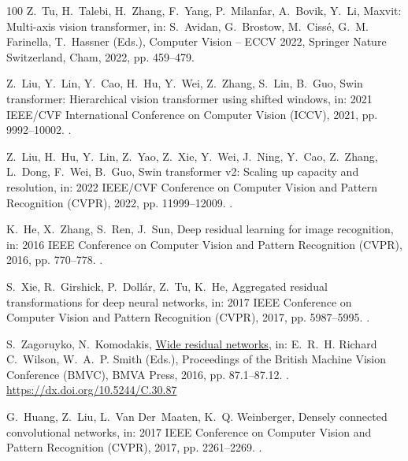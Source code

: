 \documentclass[final,3p,times,twocolumn]{elsarticle}
\begin{document}
\begin{thebibliography}{100}
Z.~Tu, H.~Talebi, H.~Zhang, F.~Yang, P.~Milanfar, A.~Bovik, Y.~Li, Maxvit:
  Multi-axis vision transformer, in: S.~Avidan, G.~Brostow, M.~Ciss{\'e}, G.~M.
  Farinella, T.~Hassner (Eds.), Computer Vision -- ECCV 2022, Springer Nature
  Switzerland, Cham, 2022, pp. 459--479.

Z.~Liu, Y.~Lin, Y.~Cao, H.~Hu, Y.~Wei, Z.~Zhang, S.~Lin, B.~Guo, Swin
  transformer: Hierarchical vision transformer using shifted windows, in: 2021
  IEEE/CVF International Conference on Computer Vision (ICCV), 2021, pp.
  9992--10002.
\newblock \href {https://doi.org/10.1109/ICCV48922.2021.00986}
  {}.

Z.~Liu, H.~Hu, Y.~Lin, Z.~Yao, Z.~Xie, Y.~Wei, J.~Ning, Y.~Cao, Z.~Zhang,
  L.~Dong, F.~Wei, B.~Guo, Swin transformer v2: Scaling up capacity and
  resolution, in: 2022 IEEE/CVF Conference on Computer Vision and Pattern
  Recognition (CVPR), 2022, pp. 11999--12009.
\newblock \href {https://doi.org/10.1109/CVPR52688.2022.01170}
  {}.

K.~He, X.~Zhang, S.~Ren, J.~Sun, Deep residual learning for image recognition,
  in: 2016 IEEE Conference on Computer Vision and Pattern Recognition (CVPR),
  2016, pp. 770--778.
\newblock \href {https://doi.org/10.1109/CVPR.2016.90}
  {}.

S.~Xie, R.~Girshick, P.~Dollár, Z.~Tu, K.~He, Aggregated residual
  transformations for deep neural networks, in: 2017 IEEE Conference on
  Computer Vision and Pattern Recognition (CVPR), 2017, pp. 5987--5995.
\newblock \href {https://doi.org/10.1109/CVPR.2017.634}
  {}.

S.~Zagoruyko, N.~Komodakis, \href{https://dx.doi.org/10.5244/C.30.87}{Wide
  residual networks}, in: E.~R.~H. Richard C.~Wilson, W.~A.~P. Smith (Eds.),
  Proceedings of the British Machine Vision Conference (BMVC), BMVA Press,
  2016, pp. 87.1--87.12.
\newblock \href {https://doi.org/10.5244/C.30.87} {}.
\newline\urlprefix\url{https://dx.doi.org/10.5244/C.30.87}

G.~Huang, Z.~Liu, L.~Van Der~Maaten, K.~Q. Weinberger, Densely connected
  convolutional networks, in: 2017 IEEE Conference on Computer Vision and
  Pattern Recognition (CVPR), 2017, pp. 2261--2269.
\newblock \href {https://doi.org/10.1109/CVPR.2017.243}
  {}.


\end{thebibliography}
\end{document}
